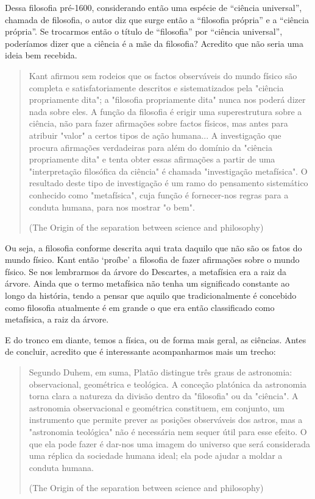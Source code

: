 Dessa filosofia pré-1600, considerando então uma espécie de “ciência universal”, chamada de filosofia, o autor diz que surge então a “filosofia própria” e a “ciência própria”. Se trocarmos então o título de “filosofia” por “ciência universal”, poderíamos dizer que a ciência é a mãe da filosofia? Acredito que não seria uma ideia bem recebida.

\begin{quote}
Kant afirmou sem rodeios que os factos observáveis do mundo físico são completa e satisfatoriamente descritos e sistematizados pela "ciência propriamente dita"; a "filosofia propriamente dita" nunca nos poderá dizer nada sobre eles. A função da filosofia é erigir uma superestrutura sobre a ciência, não para fazer afirmações sobre factos físicos, mas antes para atribuir "valor" a certos tipos de ação humana... A investigação que procura afirmações verdadeiras para além do domínio da "ciência propriamente dita" e tenta obter essas afirmações a partir de uma "interpretação filosófica da ciência" é chamada "investigação metafísica". O resultado deste tipo de investigação é um ramo do pensamento sistemático conhecido como "metafísica", cuja função é fornecer-nos regras para a conduta humana, para nos mostrar "o bem".

(The Origin of the separation between science and philosophy)
\end{quote}

Ou seja, a filosofia conforme descrita aqui trata daquilo que não são os fatos do mundo físico. Kant então ‘proíbe’ a filosofia de fazer afirmações sobre o mundo físico. Se nos lembrarmos da árvore do Descartes, a metafísica era a raiz da árvore. Ainda que o termo metafísica não tenha um significado constante ao longo da história, tendo a pensar que aquilo que tradicionalmente é concebido como filosofia atualmente é em grande o que era então classificado como metafísica, a raiz da árvore.

E do tronco em diante, temos a física, ou de forma mais geral, as ciências. Antes de concluir, acredito que é interessante acompanharmos mais um trecho:

\begin{quote}
Segundo Duhem, em suma, Platão distingue três graus de astronomia: observacional, geométrica e teológica. A conceção platónica da astronomia torna clara a natureza da divisão dentro da "filosofia" ou da "ciência". A astronomia observacional e geométrica constituem, em conjunto, um instrumento que permite prever as posições observáveis dos astros, mas a "astronomia teológica" não é necessária nem sequer útil para esse efeito. O que ela pode fazer é dar-nos uma imagem do universo que será considerada uma réplica da sociedade humana ideal; ela pode ajudar a moldar a conduta humana.

(The Origin of the separation between science and philosophy)
\end{quote}

